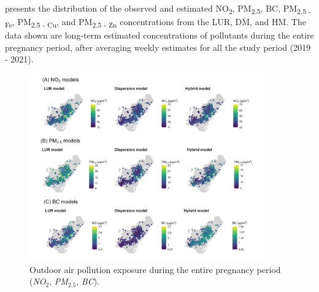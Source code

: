 \documentclass{article}
\begin{document}
\textbf{} presents the distribution of the observed and estimated NO\textsubscript{2}, PM\textsubscript{2.5}, BC,  PM\textsubscript{2.5 - Fe}, PM\textsubscript{2.5 - Cu}, and PM\textsubscript{2.5 - Zn} concentrations from the LUR, DM, and HM. The data shown are long-term estimated concentrations of pollutants during the entire pregnancy period, after averaging weekly estimates for all the study period (2019 - 2021).   


\newpage


\captionsetup[figure]{skip=6pt}
\begin{figure}[!htb]
\includegraphics[width=0.9\textwidth]{figures/combined_figure1.png}
\caption{Outdoor air pollution exposure during the entire pregnancy period (\textit{NO$_2$}, \textit{PM$_{2.5}$}, \textit{BC}).}
\end{figure}
\end{document}
